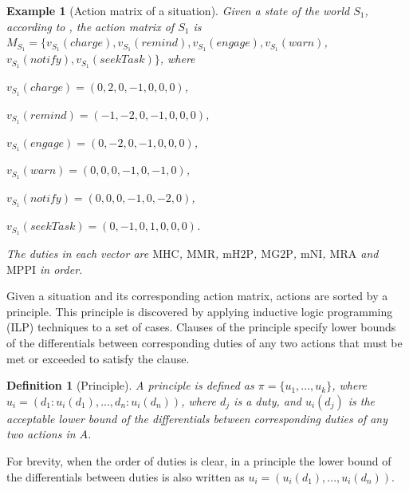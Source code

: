 \documentclass[letterpaper]{article} %
\newtheorem{definition}{Definition}
\newtheorem{example}{Example}
\begin{document}
\begin{example}[Action matrix of a situation]\label{ex-action-matrix}
Given a state of the world $S_1$, according to \cite{DBLP:journals/pieee/Anderson19},  the action matrix of $S_1$ is $M_{S_1} = \{v_{S_1}(charge), v_{S_1}(remind), v_{S_1}(engage), v_{S_1}(warn)$, $v_{S_1}(notify), v_{S_1}(seekTask)\}$, where
\begin{description}
\item $v_{S_1}(charge) = (0, 2,  0, -1, 0, 0, 0)$,
\item $v_{S_1}(remind) = (-1, -2, 0, -1, 0, 0, 0)$,
\item $v_{S_1}(engage) = (0, -2, 0, -1, 0, 0, 0)$,
\item $v_{S_1}(warn) = (0, 0, 0, -1, 0, -1, 0)$,
\item $v_{S_1}(notify) = (0, 0, 0, -1, 0, -2, 0)$,
\item $v_{S_1}(seekTask) = (0, -1, 0, 1, 0, 0, 0)$.
\end{description}
The duties in each vector are $\mathrm{MHC}$, $\mathrm{MMR}$, $\mathrm{mH2P}$, $\mathrm{MG2P}$, $\mathrm{mNI}$, $\mathrm{MRA}$ and $\mathrm{MPPI}$ in order.
\end{example}

Given a situation and its corresponding action matrix, actions are sorted by a principle.  This principle is discovered by applying inductive logic programming (ILP) techniques to a set of cases.  Clauses of the principle specify lower bounds of the differentials between corresponding duties of any two actions that must be met or exceeded to satisfy the clause.

\begin{definition}[Principle]
A principle is defined as  $\pi = \{u_1, \dots, u_k\}$, where $u_i =  ( d_1: u_i(d_1), ..., d_n: u_i(d_n)  )$, where $d_j$ is a duty, and $u_i(d_j)$ is the acceptable lower bound of the differentials between corresponding duties of any two actions in $A$. 
\end{definition}

For brevity, when the order of duties is clear, in a principle the lower bound of the differentials between duties is also written as $u_i =  ( u_i(d_1), ...,  u_i(d_n))$. 
\end{document}
